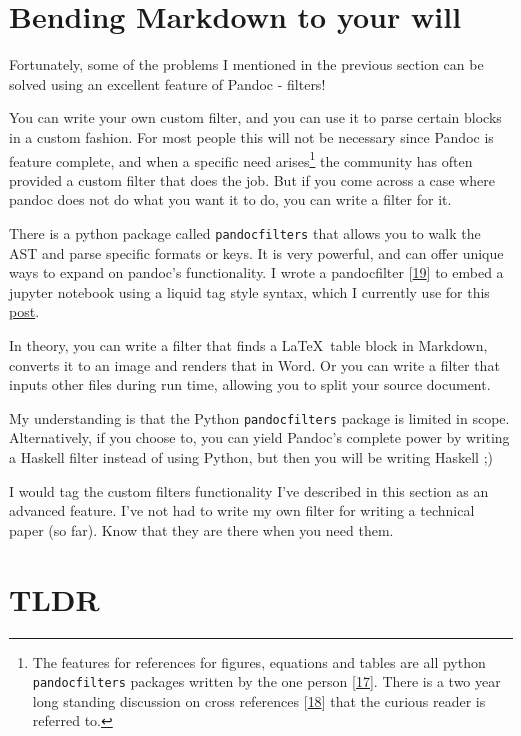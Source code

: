 \documentclass[journal,10pt,final]{IEEEtran}
\begin{document}
\section{Bending Markdown to your
will}\label{bending-markdown-to-your-will}

Fortunately, some of the problems I mentioned in the previous section
can be solved using an excellent feature of Pandoc - filters!

You can write your own custom filter, and you can use it to parse
certain blocks in a custom fashion. For most people this will not be
necessary since Pandoc is feature complete, and when a specific need
arises\footnote{The features for references for figures, equations and
  tables are all python \texttt{pandocfilters} packages written by the
  one person {[}\protect\hyperlink{ref-duckux5fgithub}{17}{]}. There is
  a two year long standing discussion on cross references
  {[}\protect\hyperlink{ref-ux5fpandoc-1}{18}{]} that the curious reader
  is referred to.} the community has often provided a custom filter that
does the job. But if you come across a case where pandoc does not do
what you want it to do, you can write a filter for it.

There is a python package called \texttt{pandocfilters} that allows you
to walk the AST and parse specific formats or keys. It is very powerful,
and can offer unique ways to expand on pandoc's functionality. I wrote a
pandocfilter {[}\protect\hyperlink{ref-krishnamurthyux5fgithub-1}{19}{]}
to embed a jupyter notebook using a liquid tag style syntax, which I
currently use for this
\href{http://kdheepak.com/blog/active-reactive-and-apparent-power.html}{post}.

In theory, you can write a filter that finds a \LaTeX~table block in
Markdown, converts it to an image and renders that in Word. Or you can
write a filter that inputs other files during run time, allowing you to
split your source document.

My understanding is that the Python \texttt{pandocfilters} package is
limited in scope. Alternatively, if you choose to, you can yield
Pandoc's complete power by writing a Haskell filter instead of using
Python, but then you will be writing Haskell ;)

I would tag the custom filters functionality I've described in this
section as an advanced feature. I've not had to write my own filter for
writing a technical paper (so far). Know that they are there when you
need them.

\section{TLDR}\label{tldr}
\end{document}
